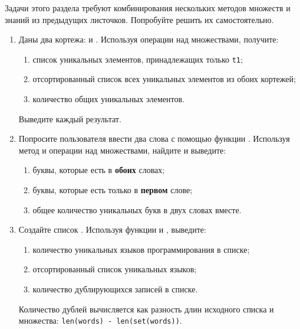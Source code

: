 \documentclass[a4,12pt]{article}
\theoremstyle{remark}
\begin{document}
\begin{exercisecomment}[title=Раздел 8. Задачи повышенной сложности]
Задачи этого раздела требуют комбинирования нескольких методов множеств
и знаний из предыдущих листочков. Попробуйте решить их самостоятельно.
\end{exercisecomment}

\begin{enumerate}[resume]

    \item Даны два кортежа: {} и {}. Используя операции над множествами, получите:
    \begin{enumerate}[label=\alph*)]
        \item список уникальных элементов, принадлежащих только \texttt{t1};
        \item отсортированный список всех уникальных элементов из обоих кортежей;
        \item количество общих уникальных элементов.
    \end{enumerate}
    Выведите каждый результат.

    \item Попросите пользователя ввести два слова с помощью функции {}. Используя метод {} и операции над множествами, найдите и выведите:
    \begin{enumerate}[label=\alph*)]
        \item буквы, которые есть в \textbf{обоих} словах;
        \item буквы, которые есть только в \textbf{первом} слове;
        \item общее количество уникальных букв в двух словах вместе.
    \end{enumerate}

    \item Создайте список {}. Используя функции {} и {}, выведите:
    \begin{enumerate}[label=\alph*)]
        \item количество уникальных языков программирования в списке;
        \item отсортированный список уникальных языков;
        \item количество дублирующихся записей в списке.
    \end{enumerate}

    \begin{exercisecomment}
    Количество дублей вычисляется как разность длин исходного списка и множества:
    \texttt{len(words) - len(set(words))}.
    \end{exercisecomment}

\end{enumerate}
\end{document}
